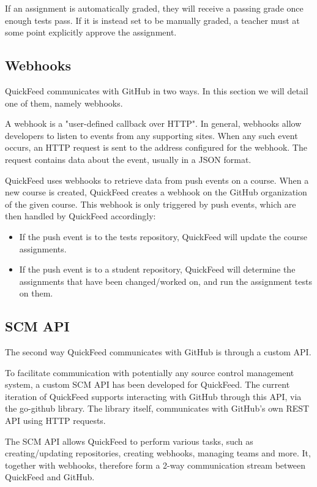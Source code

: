 If an assignment is automatically graded, they will receive a passing grade once enough tests pass.
If it is instead set to be manually graded, a teacher must at some point explicitly approve the assignment.

\subsection{Webhooks}

QuickFeed communicates with GitHub in two ways.
In this section we will detail one of them, namely webhooks.

A webhook is a "user-defined callback over HTTP". %
In general, webhooks allow developers to listen to events from any supporting sites.
When any such event occurs, an HTTP request is sent to the address configured for the webhook.
The request contains data about the event, usually in a JSON format.

QuickFeed uses webhooks to retrieve data from push events on a course.
When a new course is created, QuickFeed creates a webhook on the GitHub organization of the given course.
This webhook is only triggered by push events, which are then handled by QuickFeed accordingly:

\begin{itemize}
    \item If the push event is to the tests repository, QuickFeed will update the course assignments.
    \item If the push event is to a student repository, QuickFeed will determine the assignments that have been changed/worked on, 
    and run the assignment tests on them.
\end{itemize}

\subsection{SCM API}

The second way QuickFeed communicates with GitHub is through a custom API.

To facilitate communication with potentially any source control management system, a custom SCM API has been developed for QuickFeed.
The current iteration of QuickFeed supports interacting with GitHub through this API, via the go-github library. %
The library itself, communicates with GitHub's own REST API using HTTP requests.

The SCM API allows QuickFeed to perform various tasks, such as creating/updating repositories, creating webhooks, managing teams and more.
It, together with webhooks, therefore form a 2-way communication stream between QuickFeed and GitHub.